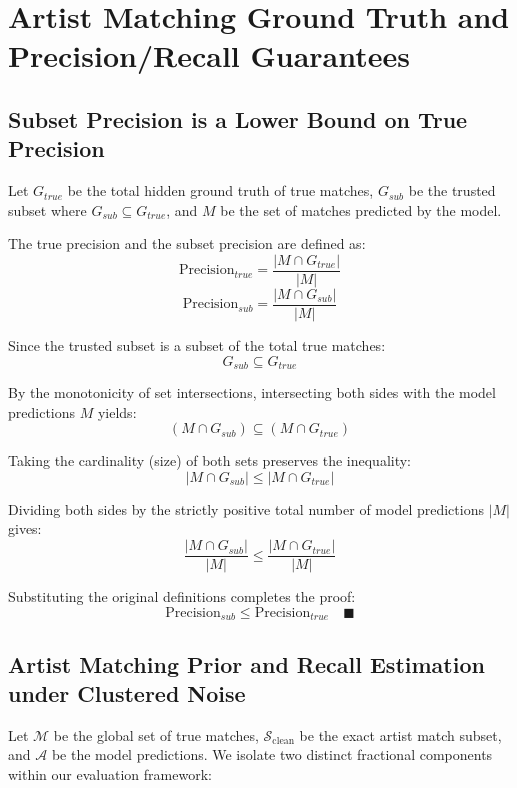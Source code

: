 \section{Artist Matching Ground Truth and Precision/Recall Guarantees}
\label{annex:artist_matching}

\subsection{Subset Precision is a Lower Bound on True Precision}

Let $G_{true}$ be the total hidden ground truth of true matches, $G_{sub}$ be the trusted subset where $G_{sub} \subseteq G_{true}$, and $M$ be the set of matches predicted by the model.

The true precision and the subset precision are defined as:
\[
\text{Precision}_{true} = \frac{|M \cap G_{true}|}{|M|}
\]
\[
\text{Precision}_{sub} = \frac{|M \cap G_{sub}|}{|M|}
\]

Since the trusted subset is a subset of the total true matches:
\[
G_{sub} \subseteq G_{true}
\]

By the monotonicity of set intersections, intersecting both sides with the model predictions $M$ yields:
\[
(M \cap G_{sub}) \subseteq (M \cap G_{true})
\]

Taking the cardinality (size) of both sets preserves the inequality:
\[
|M \cap G_{sub}| \leq |M \cap G_{true}|
\]

Dividing both sides by the strictly positive total number of model predictions $|M|$ gives:
\[
\frac{|M \cap G_{sub}|}{|M|} \leq \frac{|M \cap G_{true}|}{|M|}
\]

Substituting the original definitions completes the proof:
\[
\text{Precision}_{sub} \leq \text{Precision}_{true} \quad \blacksquare
\]

\subsection{Artist Matching Prior and Recall Estimation under Clustered Noise}

Let $\mathcal{M}$ be the global set of true matches, $\mathcal{S}_{\text{clean}}$ be the exact artist match subset, and $\mathcal{A}$ be the model predictions. We isolate two distinct fractional components within our evaluation framework:

